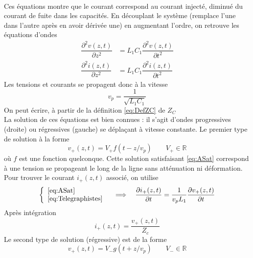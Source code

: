 \ 

Ces équations montre que le courant correspond au courant injecté, diminué du courant de 
fuite dans les capacités. En découplant le système (remplace l'une dans l'autre après 
en avoir dérivée une) en augmentant l'ordre, on retrouve les équations d'ondes
\begin{equation}
\begin{array}{ll}
\dfrac{\partial^2 v(z,t)}{\partial z^2} &= L_1C_1\dfrac{\partial^2 v(z,t)}{\partial t^2}\\
\dfrac{\partial^2 i(z,t)}{\partial z^2} &= L_1C_1\dfrac{\partial^2 i(z,t)}{\partial t^2}
\end{array}
\end{equation}
Les tensions et courants se propagent donc à la vitesse 
\begin{equation}
v_p = \dfrac{1}{\sqrt{L_1C_1}}
\end{equation}
On peut écrire, à partir de la définition \autoref{eq:DefZC} de $Z_C$\\
La solution de ces équations est bien connues : il s'agit d'ondes progressives (droite) ou 
régressives (gauche) se déplaçant à vitesse constante. Le premier type de solution à la 
forme
\begin{equation}
v_+(z,t) = V_+f(t-z/v_p)\qquad V_+\in\mathbb{R}
\end{equation}
où $f$ est une fonction quelconque. Cette solution satisfaisant \autoref{eq:ASat} correspond 
à une tension se propageant le long de la ligne sans atténuation ni déformation. Pour trouver 
le courant $i_+(z,t)$ associé, on utilise
\begin{equation}
\left\{\begin{array}{l}
\autoref{eq:ASat}\\
\autoref{eq:Telegraphistes}
\end{array}\right.\quad\Longrightarrow\quad \dfrac{\partial i_+(z,t)}{\partial t} = 
\dfrac{1}{v_pL_1}\dfrac{\partial v_+(z,t)}{\partial t}
\end{equation}
Après intégration
\begin{equation}
i_+(z,t) = \dfrac{v_+(z,t)}{Z_c}
\end{equation}
Le second type de solution (régressive) est de la forme
\begin{equation}
v_+(z,t) = V_-g(t+z/v_p)\qquad V_-\in\mathbb{R}
\end{equation}




